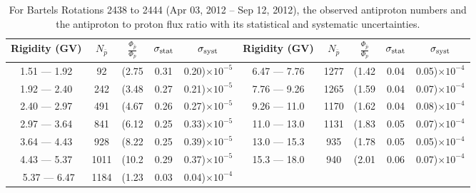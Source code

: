 \begin{table}[p] 
\renewcommand\baselinestretch{1.3}\selectfont
\setlength\tabcolsep{3pt}
\centering
\begin{tabular}{ccccc | ccccc}
\hline
\textbf{Rigidity}  (GV)  & $N_{\bar{p}}$ & $\frac{\Phi_{\bar{p}}}{\Phi_{p}}$ & $\sigma_{\rm{stat}}$ & $\sigma_{\rm{syst}}$ \hspace{1cm}   & \textbf{Rigidity}  (GV)  & $N_{\bar{p}}$ & $\frac{\Phi_{\bar{p}}}{\Phi_{p}}$ & $\sigma_{\rm{stat}}$ & $\sigma_{\rm{syst}}$ \hspace{1cm} \\ 
\hline
1.51 — 1.92   &  92                  &(2.75                          &  0.31              &      0.20)$\times 10^{-5}$  & 6.47 — 7.76                &  1277                    &(1.42                                &  0.04                   &      0.05)$\times 10^{-4}$\\
1.92 — 2.40   &  242                &(3.48                          &  0.27              &      0.21)$\times 10^{-5}$  & 7.76 — 9.26                &  1265                    &(1.59                                &  0.04                   &      0.07)$\times 10^{-4}$\\
2.40 — 2.97   &  491                &(4.67                          &  0.26              &      0.27)$\times 10^{-5}$  & 9.26 — 11.0                &  1170                    &(1.62                                &  0.04                   &      0.08)$\times 10^{-4}$\\    
2.97 — 3.64   &  841                &(6.12                          &  0.25              &      0.33)$\times 10^{-5}$  & 11.0 — 13.0                 &  1131                    &(1.83                                &  0.05                   &      0.07)$\times 10^{-4}$\\    
3.64 — 4.43   &  928                &(8.22                          &  0.25              &      0.39)$\times 10^{-5}$  & 13.0 — 15.3               &  935                    &(1.78                                &  0.05                   &      0.05)$\times 10^{-4}$\\
4.43 — 5.37   &  1011              &(10.2                          &  0.29              &      0.37)$\times 10^{-5}$  & 15.3 — 18.0               &  940                    &(2.01                                &  0.06                   &      0.07)$\times 10^{-4}$\\\
5.37 — 6.47   &  1184              &(1.23                          &  0.03              &      0.04)$\times 10^{-4}$  & \\
\hline
\end{tabular}
\caption[Antiproton to proton flux ratio for Bartels Rotations 2438 to 2444]{For Bartels Rotations 2438 to 2444 (Apr 03, 2012 – Sep 12, 2012), the observed antiproton numbers and the antiproton to proton flux ratio with its statistical and systematic uncertainties.}
\label{TableOfDependent3}
\end{table}

